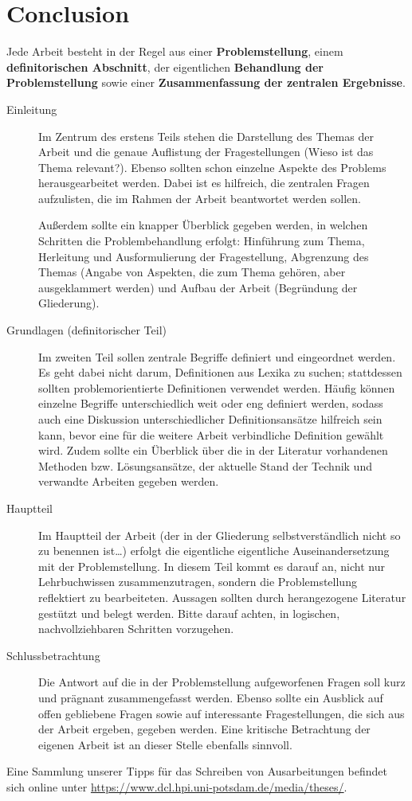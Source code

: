 \chapter{Conclusion}

Jede Arbeit besteht in der Regel aus einer \textbf{Problemstellung}, einem \textbf{definitorischen Abschnitt}, der eigentlichen \textbf{Behandlung der Problemstellung} sowie einer \textbf{Zusammenfassung der zentralen Ergebnisse}.

\begin{description}

	\item[Einleitung] Im Zentrum des erstens Teils stehen die Darstellung des Themas der Arbeit und die genaue Auflistung der Fragestellungen (Wieso ist das Thema relevant?). Ebenso sollten schon einzelne Aspekte des Problems herausgearbeitet werden. Dabei ist es hilfreich, die zentralen Fragen aufzulisten, die im Rahmen der Arbeit beantwortet werden sollen.
	
	Außerdem sollte ein knapper Überblick gegeben werden, in welchen Schritten die Problembehandlung erfolgt: Hinführung zum Thema, Herleitung und Ausformulierung der Fragestellung, Abgrenzung des Themas (Angabe von Aspekten, die zum Thema gehören, aber ausgeklammert werden) und Aufbau der Arbeit (Begründung der Gliederung).
	
	\item[Grundlagen (definitorischer Teil)] Im zweiten Teil sollen zentrale Begriffe definiert und eingeordnet werden. Es geht dabei nicht darum, Definitionen aus Lexika zu suchen; stattdessen sollten problemorientierte Definitionen verwendet werden. Häufig können einzelne Begriffe unterschiedlich weit oder eng definiert werden, sodass auch eine Diskussion unterschiedlicher Definitionsansätze hilfreich sein kann, bevor eine für die weitere Arbeit verbindliche Definition gewählt wird. Zudem sollte ein Überblick über die in der Literatur vorhandenen Methoden bzw. Lösungsansätze, der aktuelle Stand der Technik und verwandte Arbeiten gegeben werden.
	
	\item[Hauptteil] Im Hauptteil der Arbeit (der in der Gliederung selbstverständlich nicht so zu benennen ist\ldots) erfolgt die eigentliche eigentliche Auseinandersetzung mit der Problemstellung. In diesem Teil kommt es darauf an, nicht nur Lehrbuchwissen zusammenzutragen, sondern die Problemstellung reflektiert zu bearbeiteten. Aussagen sollten durch herangezogene Literatur gestützt und belegt werden. Bitte darauf achten, in logischen, nachvollziehbaren Schritten vorzugehen.
	
	\item[Schlussbetrachtung] Die Antwort auf die in der Problemstellung aufgeworfenen Fragen soll kurz und prägnant zusammengefasst werden. Ebenso sollte ein Ausblick auf offen gebliebene Fragen sowie auf interessante Fragestellungen, die sich aus der Arbeit ergeben, gegeben werden. Eine kritische Betrachtung der eigenen Arbeit ist an dieser Stelle ebenfalls sinnvoll.

\end{description}

\noindent
Eine Sammlung unserer Tipps für das Schreiben von Ausarbeitungen befindet sich online unter \url{https://www.dcl.hpi.uni-potsdam.de/media/theses/}.